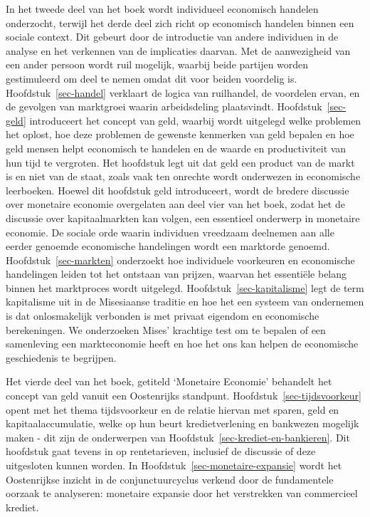 \documentclass[
  a5paper,
  smalldemyvopaper,11pt,twoside,onecolumn,openright,extrafontsizes,
hidelinks]{memoir}
\begin{document}
In het tweede deel van het boek wordt individueel economisch handelen
onderzocht, terwijl het derde deel zich richt op economisch handelen
binnen een sociale context. Dit gebeurt door de introductie van andere
individuen in de analyse en het verkennen van de implicaties daarvan.
Met de aanwezigheid van een ander persoon wordt ruil mogelijk, waarbij
beide partijen worden gestimuleerd om deel te nemen omdat dit voor
beiden voordelig is. Hoofdstuk~\ref{sec-handel} verklaart de logica van
ruilhandel, de voordelen ervan, en de gevolgen van marktgroei waarin
arbeidsdeling plaatsvindt. Hoofdstuk~\ref{sec-geld} introduceert het
concept van geld, waarbij wordt uitgelegd welke problemen het oplost,
hoe deze problemen de gewenste kenmerken van geld bepalen en hoe geld
mensen helpt economisch te handelen en de waarde en productiviteit van
hun tijd te vergroten. Het hoofdstuk legt uit dat geld een product van
de markt is en niet van de staat, zoals vaak ten onrechte wordt
onderwezen in economische leerboeken. Hoewel dit hoofdstuk geld
introduceert, wordt de bredere discussie over monetaire economie
overgelaten aan deel vier van het boek, zodat het de discussie over
kapitaalmarkten kan volgen, een essentieel onderwerp in monetaire
economie. De sociale orde waarin individuen vreedzaam deelnemen aan alle
eerder genoemde economische handelingen wordt een marktorde genoemd.
Hoofdstuk~\ref{sec-markten} onderzoekt hoe individuele voorkeuren en
economische handelingen leiden tot het ontstaan van prijzen, waarvan het
essentiële belang binnen het marktproces wordt uitgelegd.
Hoofdstuk~\ref{sec-kapitalisme} legt de term kapitalisme uit in de
Misesiaanse traditie en hoe het een systeem van ondernemen is dat
onlosmakelijk verbonden is met privaat eigendom en economische
berekeningen. We onderzoeken Mises' krachtige test om te bepalen of een
samenleving een markteconomie heeft en hoe het ons kan helpen de
economische geschiedenis te begrijpen.

Het vierde deel van het boek, getiteld `Monetaire Economie' behandelt
het concept van geld vanuit een Oostenrijks standpunt.
Hoofdstuk~\ref{sec-tijdsvoorkeur} opent met het thema tijdsvoorkeur en
de relatie hiervan met sparen, geld en kapitaalaccumulatie, welke op hun
beurt kredietverlening en bankwezen mogelijk maken - dit zijn de
onderwerpen van Hoofdstuk~\ref{sec-krediet-en-bankieren}. Dit hoofdstuk
gaat tevens in op rentetarieven, inclusief de discussie of deze
uitgesloten kunnen worden. In Hoofdstuk~\ref{sec-monetaire-expansie}
wordt het Oostenrijkse inzicht in de conjunctuurcyclus verkend door de
fundamentele oorzaak te analyseren: monetaire expansie door het
verstrekken van commercieel krediet.
\end{document}
